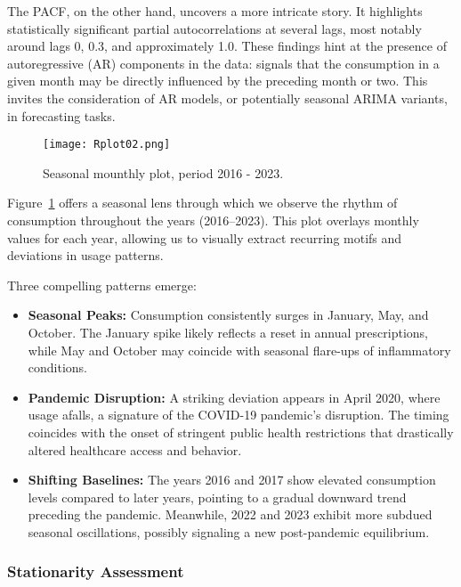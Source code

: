 \documentclass[10pt]{article}
\begin{document}
The PACF, on the other hand, uncovers a more intricate story. It highlights statistically significant partial autocorrelations at several lags, most notably around lags 0, 0.3, and approximately 1.0. These findings hint at the presence of autoregressive (AR) components in the data: signals that the consumption in a given month may be directly influenced by the preceding month or two. This invites the consideration of AR models, or potentially seasonal ARIMA variants, in forecasting tasks.

\begin{figure}[ht]
\centering
\texttt{[image: Rplot02.png]}
\caption{Seasonal mounthly plot, period 2016 - 2023.}
\label{fig:seasonal_data}
\end{figure}

Figure~\ref{fig:seasonal_data} offers a seasonal lens through which we observe the rhythm of consumption throughout the years (2016--2023). This plot overlays monthly values for each year, allowing us to visually extract recurring motifs and deviations in usage patterns.

Three compelling patterns emerge:

\begin{itemize}
    \item \textbf{Seasonal Peaks:} Consumption consistently surges in January, May, and October. The January spike likely reflects a reset in annual prescriptions, while May and October may coincide with seasonal flare-ups of inflammatory conditions.
    
    \item \textbf{Pandemic Disruption:} A striking deviation appears in April 2020, where usage afalls, a signature of the COVID-19 pandemic's disruption. The timing coincides with the onset of stringent public health restrictions that drastically altered healthcare access and behavior.
    
    \item \textbf{Shifting Baselines:} The years 2016 and 2017 show elevated consumption levels compared to later years, pointing to a gradual downward trend preceding the pandemic. Meanwhile, 2022 and 2023 exhibit more subdued seasonal oscillations, possibly signaling a new post-pandemic equilibrium.
\end{itemize}

\subsubsection{Stationarity Assessment}
\end{document}

